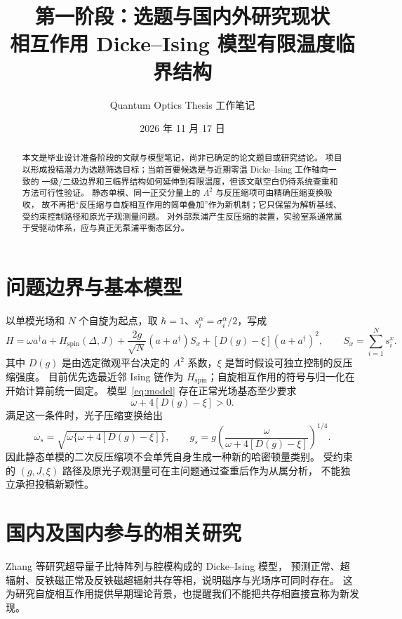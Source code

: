 \documentclass[UTF8,11pt,a4paper]{ctexart}
\title{第一阶段：选题与国内外研究现状\\[0.4em]
\large 相互作用 Dicke--Ising 模型有限温度临界结构}
\author{Quantum Optics Thesis 工作笔记}
\date{2026 年 11 月 17 日}
\begin{document}
\maketitle

\begin{abstract}
本文是毕业设计准备阶段的文献与模型笔记，尚非已确定的论文题目或研究结论。
项目以形成投稿潜力为选题筛选目标；当前首要候选是与近期零温 Dicke--Ising 工作轴向一致的
一级/二级边界和三临界结构如何延伸到有限温度，但该文献空白仍待系统查重和方法可行性验证。
静态单模、同一正交分量上的 $A^2$ 与反压缩项可由精确压缩变换吸收，
故不再把“反压缩与自旋相互作用的简单叠加”作为新机制；它只保留为解析基线、受约束控制路径和原光子观测量问题。
对外部泵浦产生反压缩的装置，实验室系通常属于受驱动体系，应与真正无泵浦平衡态区分。
\end{abstract}

\section{问题边界与基本模型}

以单模光场和 $N$ 个自旋为起点，取 $\hbar=1$、$s_i^\alpha=\sigma_i^\alpha/2$，写成
\begin{equation}
 H=\omega a^\dagger a+H_{\mathrm{spin}}(\Delta,J)
 +\frac{2g}{\sqrt N}(a+a^\dagger)S_x
 +[D(g)-\xi](a+a^\dagger)^2,
 \qquad S_x=\sum_{i=1}^{N}s_i^x .
 \label{eq:model}
\end{equation}
其中 $D(g)$ 是由选定微观平台决定的 $A^2$ 系数，$\xi$ 是暂时假设可独立控制的反压缩强度。
目前优先选最近邻 Ising 链作为 $H_{\mathrm{spin}}$；自旋相互作用的符号与归一化在开始计算前统一固定。
模型~\eqref{eq:model} 存在正常光场基态至少要求
\begin{equation}
  \omega+4[D(g)-\xi]>0 . \label{eq:stability}
\end{equation}
满足这一条件时，光子压缩变换给出
\begin{equation}
 \omega_s=\sqrt{\omega\{\omega+4[D(g)-\xi]\}},\qquad
 g_s=g\left(\frac{\omega}{\omega+4[D(g)-\xi]}\right)^{1/4}.
 \label{eq:squeezed}
\end{equation}
因此静态单模的二次反压缩项不会单凭自身生成一种新的哈密顿量类别。
受约束的 $(g,J,\xi)$ 路径及原光子观测量可在主问题通过查重后作为从属分析，
不能独立承担投稿新颖性。

\section{国内及国内参与的相关研究}

Zhang 等研究超导量子比特阵列与腔模构成的 Dicke--Ising 模型，
预测正常、超辐射、反铁磁正常及反铁磁超辐射共存等相，说明磁序与光场序可同时存在\cite{Zhang2014CircuitIsing}。
这为研究自旋相互作用提供早期理论背景，也提醒我们不能把共存相直接宣称为新发现。
\end{document}
